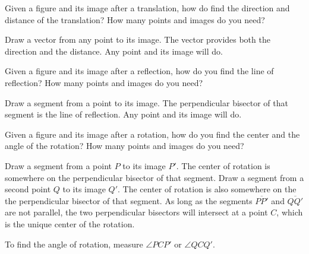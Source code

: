 \documentclass[nooutcomes]{ximera}
\begin{document}
\begin{question}
Given a figure and its image after a translation, how do find the direction and distance of the translation?    How many points and images do you need?  
\begin{freeResponse}
\begin{hint}
Draw a vector from any point to its image.  The vector provides both the direction and the distance.  Any point and its image will do.  
\end{hint}
\end{freeResponse}
\end{question}

\begin{question}
Given a figure and its image after a reflection, how do you find the line of reflection?  How many points and images do you need?  
\begin{freeResponse}
\begin{hint}
Draw a segment from a point to its image.  The perpendicular bisector of that segment is the line of reflection.  Any point and its image will do.  
\end{hint}
\end{freeResponse}
\end{question}

\begin{question}
Given a figure and its image after a rotation, how do you find the center and the angle of the rotation?  How many points and images do you need?  
\begin{freeResponse}
\begin{hint}
Draw a segment from a point $P$ to its image $P'$.  The center of rotation is somewhere on the perpendicular bisector of that segment.  Draw a segment from a second point $Q$ to its image $Q'$.  The center of rotation is also somewhere on the the perpendicular bisector of that segment.  As long as the segments $\overline{PP'}$ and $\overline{QQ'}$ are not parallel, the two perpendicular bisectors will intersect at a point $C$, which is the unique center of the rotation.  

To find the angle of rotation, measure $\angle PCP'$ or $\angle QCQ'$.
\end{hint}
\end{freeResponse}
\end{question}
\end{document}
